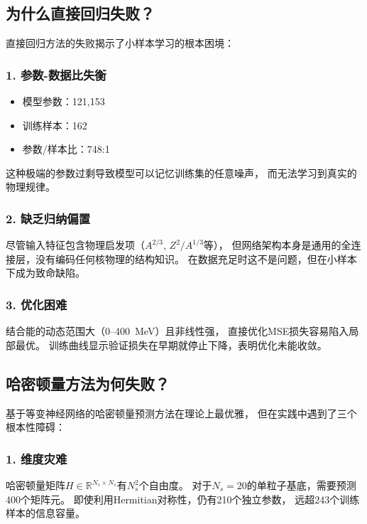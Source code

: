 \documentclass[12pt, a4paper]{article}
\newcommand{\R}{\mathbb{R}}
\begin{document}
\subsection{为什么直接回归失败？}

直接回归方法的失败揭示了小样本学习的根本困境：

\subsubsection{1. 参数-数据比失衡}

\begin{itemize}
  \item 模型参数：121,153
  \item 训练样本：162
  \item 参数/样本比：748:1
\end{itemize}

这种极端的参数过剩导致模型可以记忆训练集的任意噪声，
而无法学习到真实的物理规律。

\subsubsection{2. 缺乏归纳偏置}

尽管输入特征包含物理启发项（$A^{2/3}$, $Z^2/A^{1/3}$等），
但网络架构本身是通用的全连接层，没有编码任何核物理的结构知识。
在数据充足时这不是问题，但在小样本下成为致命缺陷。

\subsubsection{3. 优化困难}

结合能的动态范围大（0--400~MeV）且非线性强，
直接优化MSE损失容易陷入局部最优。
训练曲线显示验证损失在早期就停止下降，表明优化未能收敛。

\subsection{哈密顿量方法为何失败？}

基于等变神经网络的哈密顿量预测方法在理论上最优雅，
但在实践中遇到了三个根本性障碍：

\subsubsection{1. 维度灾难}

哈密顿量矩阵$H \in \R^{N_s \times N_s}$有$N_s^2$个自由度。
对于$N_s = 20$的单粒子基底，需要预测400个矩阵元。
即使利用Hermitian对称性，仍有210个独立参数，
远超243个训练样本的信息容量。
\end{document}
